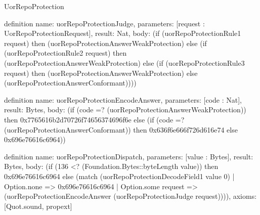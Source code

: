 \begin{lexlean}{UorRepoProtection}
\begin{semanticmodule}
definition{
  name: uorRepoProtectionJudge,
  parameters: [request : UorRepoProtectionRequest],
  result: Nat,
  body: (if (uorRepoProtectionRule1 request) then (uorRepoProtectionAnswerWeakProtection) else (if (uorRepoProtectionRule2 request) then (uorRepoProtectionAnswerWeakProtection) else (if (uorRepoProtectionRule3 request) then (uorRepoProtectionAnswerWeakProtection) else (uorRepoProtectionAnswerConformant))))
}

definition{
  name: uorRepoProtectionEncodeAnswer,
  parameters: [code : Nat],
  result: Bytes,
  body: (if (code =? (uorRepoProtectionAnswerWeakProtection)) then 0x7765616b2d70726f74656374696f6e else (if (code =? (uorRepoProtectionAnswerConformant)) then 0x636f6e666f726d616e74 else 0x696e76616c6964))
}

definition{
  name: uorRepoProtectionDispatch,
  parameters: [value : Bytes],
  result: Bytes,
  body: (if (136 <? (Foundation.Bytes::byteLength value)) then 0x696e76616c6964 else (match (uorRepoProtectionDecodeField1 value 0)
    | Option.none => 0x696e76616c6964
    | Option.some request => (uorRepoProtectionEncodeAnswer (uorRepoProtectionJudge request)))),
  axioms: [Quot.sound, propext]
}
\end{semanticmodule}
\end{lexlean}
